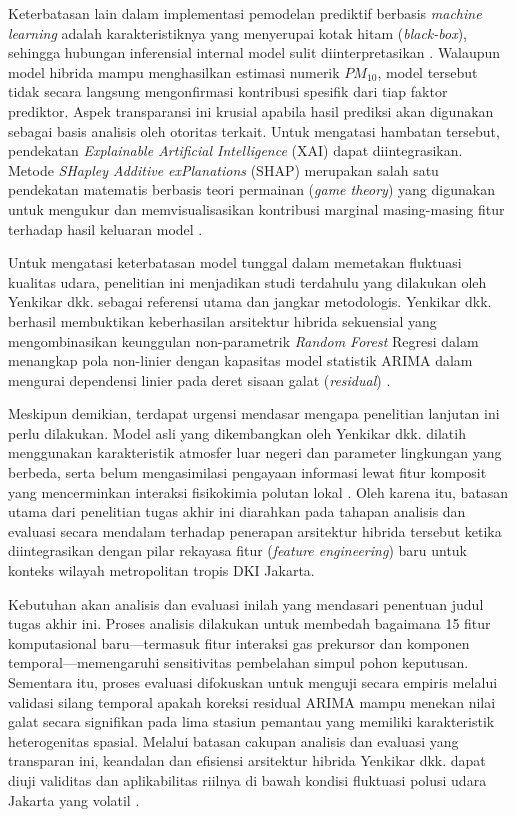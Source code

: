 Keterbatasan lain dalam implementasi pemodelan prediktif berbasis \textit{machine learning} adalah karakteristiknya yang menyerupai kotak hitam (\textit{black-box}), sehingga hubungan inferensial internal model sulit diinterpretasikan \autocite{jimenez2024explainable}. Walaupun model hibrida mampu menghasilkan estimasi numerik $PM_{10}$, model tersebut tidak secara langsung mengonfirmasi kontribusi spesifik dari tiap faktor prediktor. Aspek transparansi ini krusial apabila hasil prediksi akan digunakan sebagai basis analisis oleh otoritas terkait. Untuk mengatasi hambatan tersebut, pendekatan \textit{Explainable Artificial Intelligence} (XAI) dapat diintegrasikan. Metode \textit{SHapley Additive exPlanations} (SHAP) merupakan salah satu pendekatan matematis berbasis teori permainan (\textit{game theory}) yang digunakan untuk mengukur dan memvisualisasikan kontribusi marginal masing-masing fitur terhadap hasil keluaran model \autocite{molnar2025shap}.

Untuk mengatasi keterbatasan model tunggal dalam memetakan fluktuasi kualitas udara, penelitian ini menjadikan studi terdahulu yang dilakukan oleh Yenkikar dkk. \autocite{yenkikar2025explainable} sebagai referensi utama dan jangkar metodologis. Yenkikar dkk. berhasil membuktikan keberhasilan arsitektur hibrida sekuensial yang mengombinasikan keunggulan non-parametrik \textit{Random Forest} Regresi dalam menangkap pola non-linier dengan kapasitas model statistik ARIMA dalam mengurai dependensi linier pada deret sisaan galat (\textit{residual}) \autocite{yenkikar2025explainable}. 

Meskipun demikian, terdapat urgensi mendasar mengapa penelitian lanjutan ini perlu dilakukan. Model asli yang dikembangkan oleh Yenkikar dkk. dilatih menggunakan karakteristik atmosfer luar negeri dan parameter lingkungan yang berbeda, serta belum mengasimilasi pengayaan informasi lewat fitur komposit yang mencerminkan interaksi fisikokimia polutan lokal \autocite{yenkikar2025explainable}. Oleh karena itu, batasan utama dari penelitian tugas akhir ini diarahkan pada tahapan analisis dan evaluasi secara mendalam terhadap penerapan arsitektur hibrida tersebut ketika diintegrasikan dengan pilar rekayasa fitur (\textit{feature engineering}) baru untuk konteks wilayah metropolitan tropis DKI Jakarta.

Kebutuhan akan analisis dan evaluasi inilah yang mendasari penentuan judul tugas akhir ini. Proses analisis dilakukan untuk membedah bagaimana 15 fitur komputasional baru—termasuk fitur interaksi gas prekursor dan komponen temporal—memengaruhi sensitivitas pembelahan simpul pohon keputusan. Sementara itu, proses evaluasi difokuskan untuk menguji secara empiris melalui validasi silang temporal apakah koreksi residual ARIMA mampu menekan nilai galat secara signifikan pada lima stasiun pemantau yang memiliki karakteristik heterogenitas spasial. Melalui batasan cakupan analisis dan evaluasi yang transparan ini, keandalan dan efisiensi arsitektur hibrida Yenkikar dkk. dapat diuji validitas dan aplikabilitas riilnya di bawah kondisi fluktuasi polusi udara Jakarta yang volatil \autocite{yenkikar2025explainable}.

